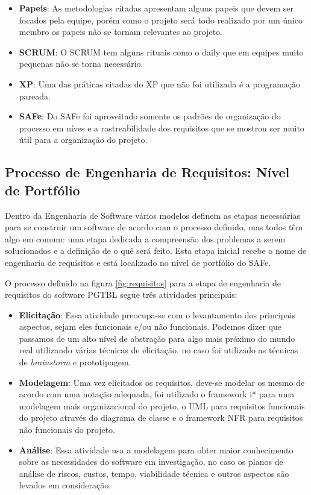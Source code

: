 \begin{itemize}
  \item \textbf{Papeis}: As metodologias citadas apresentam alguns papeis que devem ser focados pela equipe, porém
    como o projeto será todo realizado por um único membro os papeis não se tornam relevantes ao projeto.
  \item \textbf{SCRUM}: O SCRUM tem alguns rituais como o daily que em equipes muito pequenas não se torna necessário.
  \item \textbf{XP}: Uma das práticas citadas do XP que não foi utilizada é a programação pareada.
  \item \textbf{SAFe}: Do SAFe foi aproveitado somente os padrões de organização do processo em níves e a rastreabilidade dos requisitos que se mostrou ser muito útil para a organização do projeto.
\end{itemize}

\subsection{Processo de Engenharia de Requisitos: Nível de Portfólio}

Dentro da Engenharia de Software vários modelos definem as etapas necessárias para se construir um software de acordo com o processo definido, mas todos têm algo em comum: uma etapa dedicada a compreensão dos problemas a serem solucionados e a definição de o quê será feito. Esta etapa inicial recebe o nome de engenharia de requisitos e está localizado no nível de portfólio do SAFe.

O processo definido na figura \ref{fig:requisitos} para a etapa de engenharia de requisitos do software PGTBL segue três atividades principais:

\begin{itemize}
  \item \textbf{Elicitação}: Essa atividade preocupa-se com o levantamento dos principais aspectos, sejam eles funcionais e/ou não funcionais. Podemos dizer que passamos de um alto nível de abstração para algo mais próximo do mundo real utilizando várias técnicas de elicitação, no caso foi utilizado as técnicas de \textit{brainstorm} e prototipagem.
  \item \textbf{Modelagem}: Uma vez elicitados os requisitos, deve-se modelar os mesmo de acordo com uma notação adequada, foi utilizado o framework i* para uma modelagem mais organizacional do projeto, o UML para requisitos funcionais do projeto através do diagrama de classe e o framework NFR para requisitos não funcionais do projeto.
  \item \textbf{Análise}: Essa atividade usa a modelagem para obter maior conhecimento sobre as necessidades do software em investigação, no caso os planos de análise de riscos, custos, tempo, viabilidade técnica e outros aspectos são levados em
consideração.
\end{itemize}

